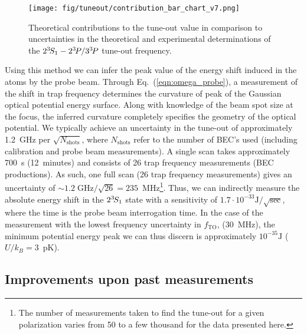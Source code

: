 	\begin{figure}[t]
	    \centering
	    \texttt{[image: fig/tuneout/contribution\_bar\_chart\_v7.png]}
	    \caption{Theoretical contributions to the tune-out value in comparison to uncertainties in the theoretical and experimental determinations of the \(2^{3\!}S_1- 2^{3\!}P / 3^{3\!}P\) tune-out frequency.}
	    \label{fig:contributions}
	\end{figure}


	
	Using this method we can infer the peak value of the energy shift induced in the atoms by the probe beam. 
	Through Eq.~(\ref{eqn:omega_probe}), a measurement of the shift in trap frequency determines the curvature of peak of the Gaussian optical potential energy surface. 
	Along with knowledge of the beam spot size at the focus, the inferred curvature completely specifies the geometry of the optical potential. 
	We typically achieve an uncertainty in the tune-out of approximately 1.2~$\text{GHz}$ per $\sqrt{N_\text{shots}}$, where \(N_\text{shots}\) refer to the number of BEC's used (including calibration and probe beam measurements). 
	A single scan takes approximately 700~s (12~minutes) and consists of 26 trap frequency measurements (BEC productions). 
	As such, one full scan (26 trap frequency measurements) gives an uncertainty of $\sim 1.2\;\mathrm{GHz}/\sqrt{26}=235$~MHz\footnote{The number of measurements taken to find the tune-out for a given polarization varies from 50 to a few thousand for the data presented here.}.
	Thus, we can indirectly measure the absolute energy shift in the $2^{3\!}S_1$ state with a sensitivity of $1.7\cdot10^{-33}\mathrm{J}/\sqrt{\mathrm{sec}}$, where the time is the probe beam interrogation time. 
	In the case of the measurement with the lowest frequency uncertainty in $f_\textrm{TO}$, (30~MHz), the minimum potential energy peak we can thus discern is approximately $10^{-35}\mathrm{J}$ ($U/k_B=3$~pK).

\subsection{Improvements upon past measurements}

